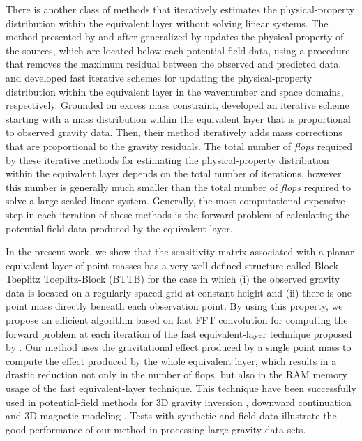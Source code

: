 There is another class of methods that iteratively estimates the physical-property distribution within 
the equivalent layer without solving linear systems.
The method presented by \citet{cordell1992} and after generalized by \citet{guspi-novara2009} updates 
the physical property of the sources, which are located below each potential-field data, using a 
procedure that removes the maximum residual between the observed and predicted data.
\citet{xia-sprowl1991} and \citet{xia-etal1993} developed 
fast iterative schemes for updating the physical-property distribution
within the equivalent layer in the wavenumber and space domains, respectively.
Grounded on excess mass constraint, \cite{siqueira-etal2017} developed an iterative scheme 
starting with a mass distribution within the equivalent layer that is proportional to observed gravity data.
Then, their method iteratively adds mass corrections that are proportional to the gravity residuals.
The total number of \textit{flops} required by these iterative methods for estimating the physical-property 
distribution within the equivalent layer depends on the total number of iterations, however this number is 
generally much smaller than the total number of \textit{flops} required to solve a large-scaled linear system. 
Generally, the most computational expensive step in each iteration of these methods is the forward problem 
of calculating the potential-field data produced by the equivalent layer.

In the present work, we show that the sensitivity matrix associated with a planar equivalent layer 
of point masses has a very well-defined structure called Block-Toeplitz Toeplitz-Block (BTTB) for 
the case in which (i) the observed gravity data is located on a regularly spaced grid at constant 
height and (ii) there is one point mass directly beneath each observation point.
By using this property, we propose an efficient algorithm based on fast FFT convolution 
\citep[e.g.,][ p. 207]{vanloan1992} for computing the forward problem at each iteration of 
the fast equivalent-layer technique proposed by \citet{siqueira-etal2017}.
Our method uses the gravitational effect produced by a single point mass to compute the 
effect produced by the whole equivalent layer, which results in a drastic reduction 
not only in the number of flops, but also in the RAM memory usage of the fast equivalent-layer technique.
This technique have been successfully used in potential-field methods for 
3D gravity inversion \citep{zhang-wong2015}, downward continuation 
\citep{zhang-etal2016} and 3D magnetic modeling \citep{qiang_etal2019}.
Tests with synthetic and field data illustrate the good performance of our method in processing 
large gravity data sets.



